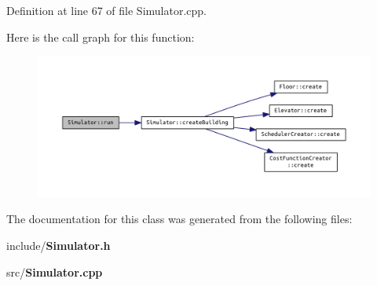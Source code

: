 Definition at line 67 of file Simulator.\+cpp.



Here is the call graph for this function\+:
\nopagebreak
\begin{figure}[H]
\begin{center}
\leavevmode
\includegraphics[width=350pt]{class_simulator_aa2de7e32b04cc3e8fc60aec23997621b_cgraph}
\end{center}
\end{figure}




The documentation for this class was generated from the following files\+:\begin{DoxyCompactItemize}
\item 
include/{\bf Simulator.\+h}\item 
src/{\bf Simulator.\+cpp}\end{DoxyCompactItemize}
